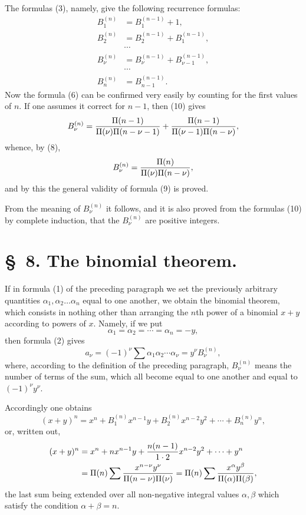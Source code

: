\documentclass[11pt]{article}
\begin{document}
The formulas (3), namely, give the following recurrence formulas:
\begin{equation}
\begin{aligned}
B_1^{(n)}&=B_1^{(n-1)}+1,\\
B_2^{(n)}&=B_2^{(n-1)}+B_1^{(n-1)},\\
&\cdots\\
B_\nu^{(n)}&=B_\nu^{(n-1)}+B_{\nu-1}^{(n-1)},\\
&\cdots\\
B_n^{(n)}&=B_{n-1}^{(n-1)}.
\end{aligned}
\tag{10}
\end{equation}
Now the formula (6) can be confirmed very easily by counting for the first values of $n$. If one assumes it correct for $n-1$, then (10) gives
\[
 B_\nu^{(n)}={\Pi(n-1)\over \Pi(\nu)\Pi(n-\nu-1)}+{\Pi(n-1)\over \Pi(\nu-1)\Pi(n-\nu)},
\]
whence, by (8),
\[
 B_\nu^{(n)}={\Pi(n)\over \Pi(\nu)\Pi(n-\nu)},
\]
and by this the general validity of formula (9) is proved.

From the meaning of $B_\nu^{(n)}$ it follows, and it is also proved from the formulas (10) by complete induction, that the $B_\nu^{(n)}$ are positive integers.

\section*{\S~8. The binomial theorem.}

If in formula (1) of the preceding paragraph we set the previously arbitrary quantities $\alpha_1,\alpha_2\ldots\alpha_n$ equal to one another, we obtain the binomial theorem, which consists in nothing other than arranging the $n$th power of a binomial $x+y$ according to powers of $x$. Namely, if we put
\[
 \alpha_1=\alpha_2=\cdots=\alpha_n=-y,
\]
then formula (2) gives
\[
 a_\nu=(-1)^\nu\sum \alpha_1\alpha_2\cdots\alpha_\nu=y^\nu B_\nu^{(n)},
\]
where, according to the definition of the preceding paragraph, $B_\nu^{(n)}$ means the number of terms of the sum, which all become equal to one another and equal to $(-1)^\nu y^\nu$.

Accordingly one obtains
\begin{equation}
 (x+y)^n=x^n+B_1^{(n)}x^{n-1}y+B_2^{(n)}x^{n-2}y^2+\cdots+B_n^{(n)}y^n,
\tag{1}
\end{equation}
or, written out,
\[
\begin{aligned}
(x+y)^n
&=x^n+nx^{n-1}y+{n(n-1)\over1\cdot2}x^{n-2}y^2+\cdots+y^n\\
&=\Pi(n)\sum {x^{n-\nu}y^\nu\over \Pi(n-\nu)\Pi(\nu)}
 =\Pi(n)\sum {x^\alpha y^\beta\over \Pi(\alpha)\Pi(\beta)},
\end{aligned}
\]
the last sum being extended over all non-negative integral values $\alpha,\beta$ which satisfy the condition $\alpha+\beta=n$.
\end{document}
